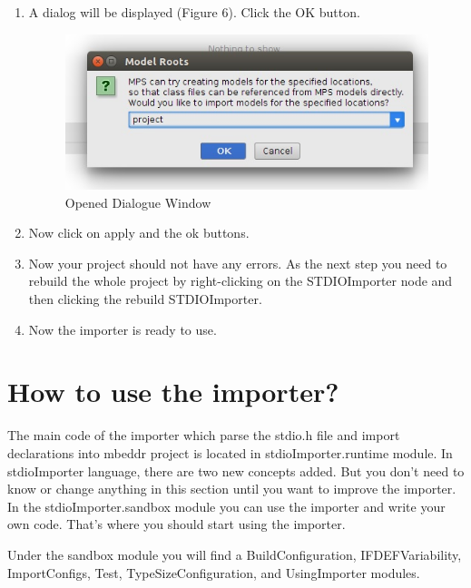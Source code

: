 \documentclass{article}
\begin{document}
\begin{itemize}
\begin{enumerate}
\item
A dialog will be displayed (Figure 6). Click the OK button.
\begin{figure}[h]
\caption{Opened Dialogue Window}
\centering
\includegraphics[scale=0.5]{dialog.jpg}
\end{figure}
\item
Now click on apply and the ok buttons.
\item
Now your project should not have any errors.  As the next step you need to rebuild the whole project by right-clicking on the STDIOImporter node and then clicking the rebuild STDIOImporter.
\item
Now the importer is ready to use.
\end{enumerate}
\end{itemize}

\section{How to use the importer?}

The main code of the importer which parse the stdio.h file and import declarations into mbeddr project is located in stdioImporter.runtime module. In stdioImporter language, there are two new concepts added. But you don't need to know or change anything in this section until you want to improve the importer. In the stdioImporter.sandbox module you can use the importer and write your own code. That's where you should start using the importer.

Under the sandbox module you will find a BuildConfiguration, IFDEFVariability, ImportConfigs, Test, TypeSizeConfiguration, and UsingImporter modules.
\end{document}
